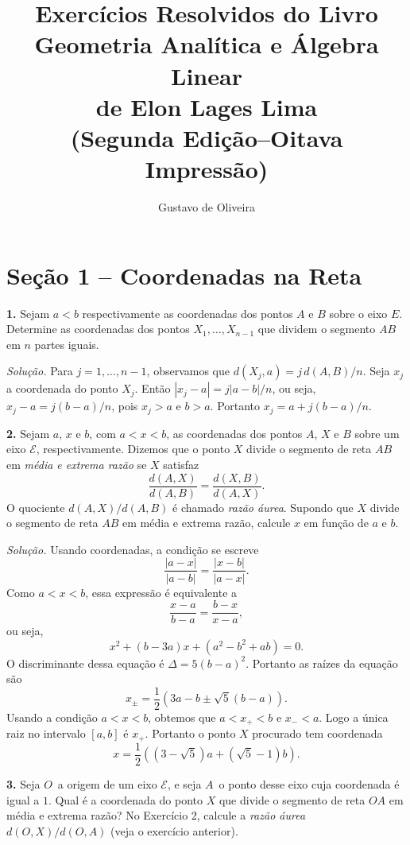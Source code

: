 \documentclass[a4paper,11pt]{article}
\title{Exercícios Resolvidos do Livro\\Geometria Analítica e Álgebra Linear\\de Elon Lages Lima\\(Segunda Edição--Oitava Impressão)}
\author{Gustavo de Oliveira}
\begin{document}
\maketitle

\section*{Seção 1 -- Coordenadas na Reta}

\textbf{1.}
Sejam $a < b$ respectivamente as coordenadas dos pontos $A$ e $B$ sobre o eixo $E$.
Determine as coordenadas dos pontos $X_1, \dots, X_{n-1}$ que dividem o segmento $AB$ em $n$ partes iguais.

\vspace{\baselineskip}

\emph{Solução.}
Para $j = 1, \dots, n-1$, observamos que $d(X_j,a) = j \, d(A,B)/n$.
Seja $x_j$ a coordenada do ponto $X_j$.
Então $|x_j - a| = j|a-b|/n$, ou seja, $x_j - a = j(b-a)/n$, pois $x_j > a$ e $b > a$.
Portanto $x_j = a + j(b-a)/n$.

\vspace{\baselineskip}

\textbf{2.}
Sejam $a$, $x$ e $b$, com $a < x < b$, as coordenadas dos pontos $A$, $X$ e $B$ sobre um eixo $\mathcal{E}$, respectivamente.
Dizemos que o ponto $X$ divide o segmento de reta $AB$ em \emph{média e extrema razão} se $X$ satisfaz
\[
  \frac{d(A,X)}{d(A,B)} = \frac{d(X,B)}{d(A,X)}.
\]
O quociente $d(A,X)/d(A,B)$ é chamado \emph{razão áurea}.
Supondo que $X$ divide o segmento de reta $AB$ em média e extrema razão, calcule $x$ em função de $a$ e $b$.

\vspace{\baselineskip}

\emph{Solução.}
Usando coordenadas, a condição se escreve
\[
  \frac{|a-x|}{|a-b|} = \frac{|x-b|}{|a-x|}.
\]
Como $a < x < b$, essa expressão é equivalente a
\[
  \frac{x-a}{b-a} = \frac{b-x}{x-a},
\]
ou seja,
\[
  x^2 + (b-3a) x + (a^2-b^2+ab) = 0.
\]
O discriminante dessa equação é $\Delta = 5(b-a)^2$.
Portanto as raízes da equação são
\[
  x_{\pm} = \frac{1}{2} (3a - b \pm \sqrt{5}(b-a)).
\]
Usando a condição $a < x < b$, obtemos que $a < x_+ < b$ e $x_- < a$.
Logo a única raiz no intervalo $[a,b]$ é $x_+$.
Portanto o ponto $X$ procurado tem coordenada
\[
  x = \frac{1}{2} ( (3-\sqrt{5}) a + (\sqrt{5}-1) b ).
\]

\vspace{\baselineskip}

\textbf{3.}
Seja $O\,$ a origem de um eixo $\mathcal{E}$, e seja $A\,$ o ponto desse eixo cuja coordenada é igual a $1$.
Qual é a coordenada do ponto $X$ que divide o segmento de reta $OA$ em média e extrema razão?
No Exercício 2, calcule a \emph{razão áurea} $d(O,X)/d(O,A)$ (veja o exercício anterior).
\end{document}
